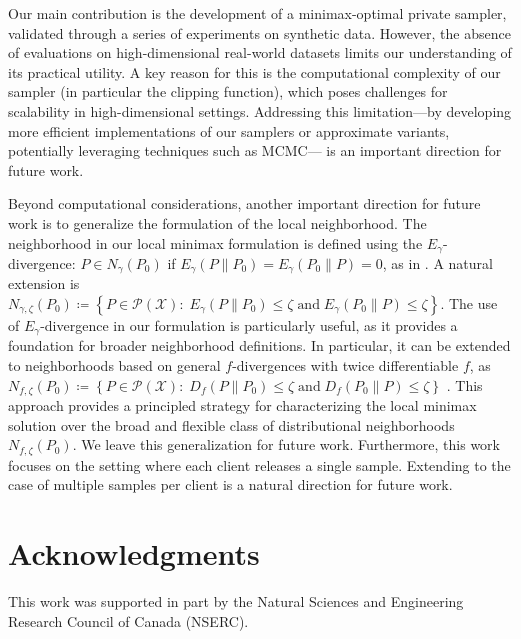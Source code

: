 \documentclass[accepted]{article}
\theoremstyle{plain} %
\theoremstyle{definition}
\theoremstyle{remark}
\begin{document}
Our main contribution is the development of a minimax-optimal private sampler, validated through a series of experiments on synthetic data. However, the absence of evaluations on high-dimensional real-world datasets limits our understanding of its practical utility. A key reason for this is the computational complexity of our sampler (in particular the clipping function), which poses challenges for scalability in high-dimensional settings. Addressing this limitation---by developing more efficient implementations of our samplers or approximate variants, potentially leveraging techniques such as MCMC--- is an important direction for future work.


Beyond computational considerations, another important direction for future work is to generalize the formulation of the local neighborhood. The neighborhood in our local minimax formulation is defined using the $E_\gamma$-divergence: $P\in N_\gamma(P_0)$ if  \( E_\gamma(P \| P_0) = E_\gamma(P_0 \| P) = 0 \), as in \citep{feldman2024instance}. A natural extension is 
$N_{\gamma,\zeta}(P_0) \coloneqq \left\{ P \in \mathcal{P}(\mathcal{X}) :\; E_\gamma(P \| P_0) \leq \zeta \;\text{and}\; E_\gamma(P_0 \| P) \leq \zeta \right\}$. 
The use of $E_\gamma$-divergence in our formulation is particularly useful, as it provides a foundation for broader neighborhood definitions. In particular, it can be extended to neighborhoods based on general \( f \)-divergences with twice differentiable \( f \), as  
$
N_{f,\zeta}(P_0) \coloneqq \left\{ P \in \mathcal{P}(\mathcal{X}) :\; D_f(P \| P_0) \leq \zeta \;\text{and}\; D_f(P_0 \| P) \leq \zeta \right\}
$ \citep{polyanskiy2015dissipation,raginsky2016strong,zamanlooy2023strong,asoodeh2024contraction}.  
This approach provides a principled strategy for characterizing the local minimax solution over the broad and flexible class of distributional neighborhoods $N_{f,\zeta}(P_0)$. We leave this generalization for future work. 
Furthermore, this work focuses on the setting where each client releases a single sample. Extending to the case of multiple samples per client is a natural direction for future work.


 \newpage

 \section*{Acknowledgments} 
 This work was supported in part by the Natural Sciences and Engineering Research Council of Canada (NSERC).
\end{document}
